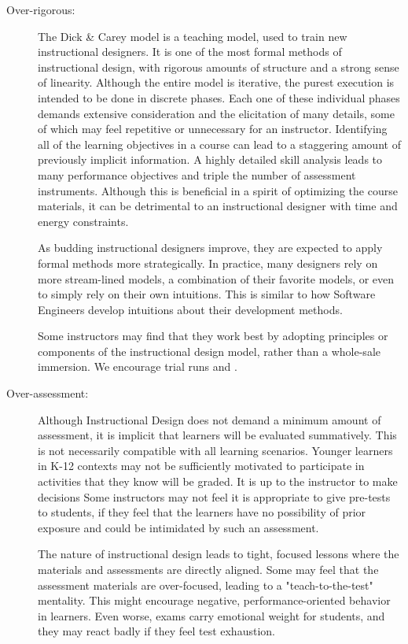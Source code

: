 \begin{description}

\item[Over-rigorous:]

The Dick \& Carey model is a teaching model, used to train new instructional designers.
It is one of the most formal methods of instructional design, with rigorous amounts of structure and a strong sense of linearity.
Although the entire model is iterative, the purest execution is intended to be done in discrete phases.
Each one of these individual phases demands extensive consideration and the elicitation of many details, some of which may feel repetitive or unnecessary for an instructor.
Identifying all of the learning objectives in a course can lead to a staggering amount of previously implicit information.
A highly detailed skill analysis leads to many performance objectives and triple the number of assessment instruments.
Although this is beneficial in a spirit of optimizing the course materials, it can be detrimental to an instructional designer with time and energy constraints.

As budding instructional designers improve, they are expected to apply formal methods more strategically.
In practice, many designers rely on more stream-lined models, a combination of their favorite models, or even to simply rely on their own intuitions.
This is similar to how Software Engineers develop intuitions about their development methods.

Some instructors may find that they work best by adopting principles or components of the instructional design model, rather than a whole-sale immersion.
We encourage trial runs and .

\item[Over-assessment:]
Although Instructional Design does not demand a minimum amount of assessment, it is implicit that learners will be evaluated summatively.
This is not necessarily compatible with all learning scenarios.
Younger learners in K-12 contexts may not be sufficiently motivated to participate in activities that they know will be graded.
It is up to the instructor to make decisions
Some instructors may not feel it is appropriate to give pre-tests to students, if they feel that the learners have no possibility of prior exposure and could be intimidated by such an assessment.

The nature of instructional design leads to tight, focused lessons where the materials and assessments are directly aligned.
Some may feel that the assessment materials are over-focused, leading to a "teach-to-the-test" mentality.
This might encourage negative, performance-oriented behavior in learners.
Even worse, exams carry emotional weight for students, and they may react badly if they feel test exhaustion.


\end{description}
